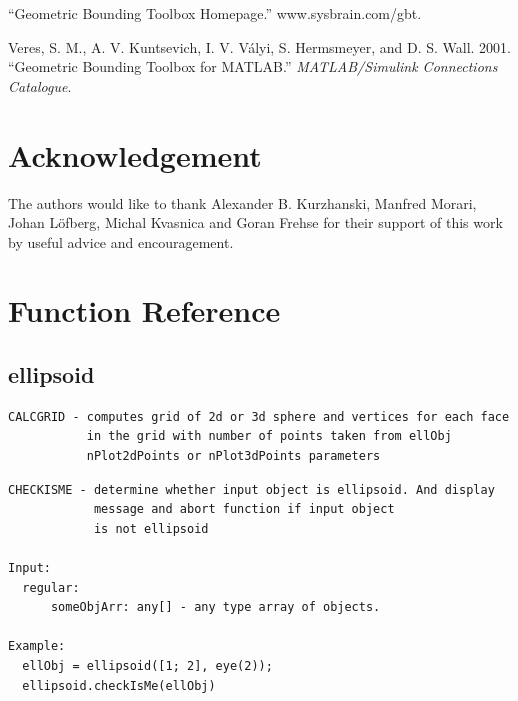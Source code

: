 \documentclass[letterpaper,10pt,english]{sphinxmanual}
\begin{document}
“Geometric Bounding Toolbox Homepage.” www.sysbrain.com/gbt.

Veres, S. M., A. V. Kuntsevich, I. V. Vályi, S. Hermsmeyer, and D. S.
Wall. 2001. “Geometric Bounding Toolbox for MATLAB.” \emph{MATLAB/Simulink
Connections Catalogue}.


\chapter{Acknowledgement}
\label{chap_acknowledge::doc}\label{chap_acknowledge:acknowledgement}
The authors would like to thank Alexander B. Kurzhanski, Manfred Morari,
Johan Löfberg, Michal Kvasnica and Goran Frehse for their support of
this work by useful advice and encouragement.


\chapter{Function Reference}
\label{chap_func::doc}\label{chap_func:function-reference}

\section{ellipsoid}
\label{chap_func:ellipsoid}
\begin{Verbatim}[commandchars=\\\{\}]
CALCGRID - computes grid of 2d or 3d sphere and vertices for each face
           in the grid with number of points taken from ellObj
           nPlot2dPoints or nPlot3dPoints parameters
\end{Verbatim}

\begin{Verbatim}[commandchars=\\\{\}]
CHECKISME - determine whether input object is ellipsoid. And display
            message and abort function if input object
            is not ellipsoid

Input:
  regular:
      someObjArr: any[] - any type array of objects.

Example:
  ellObj = ellipsoid([1; 2], eye(2));
  ellipsoid.checkIsMe(ellObj)
\end{Verbatim}
\end{document}
